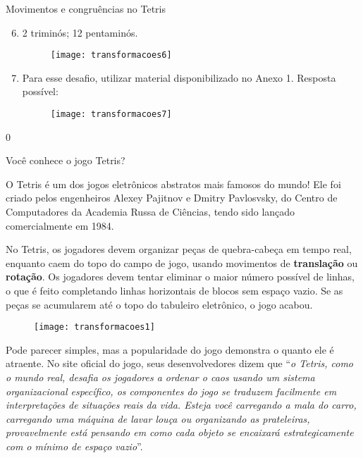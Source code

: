 \begin{answer}{Movimentos e congruências no Tetris}
{
\begin{enumerate}\setcounter{enumi}{5}
\item 2 triminós; 12 pentaminós.
\begin{figure}[H]
\centering

\texttt{[image: transformacoes6]}
\end{figure}

\item Para esse desafio, utilizar material disponibilizado no Anexo 1. Resposta possível:
\begin{figure}[H]
\centering

\texttt{[image: transformacoes7]}
\end{figure}
\end{enumerate}
}{0}
\end{answer}

Você conhece o jogo Tetris? 

O Tetris é um dos jogos eletrônicos abstratos mais famosos do mundo! Ele foi criado pelos engenheiros Alexey Pajitnov e Dmitry Pavlosvsky, do Centro de Computadores da Academia Russa de Ciências, tendo sido lançado comercialmente em 1984. 

No Tetris, os jogadores devem organizar peças de quebra-cabeça em tempo real, enquanto caem do topo do campo de jogo, usando movimentos de \textbf{translação} ou \textbf{rotação}. Os jogadores devem tentar eliminar o maior número possível de linhas, o que é feito completando linhas horizontais de blocos sem espaço vazio. Se as peças se acumularem até o topo do tabuleiro eletrônico, o jogo acabou. 

\begin{figure}[H]
\centering

\texttt{[image: transformacoes1]}
\end{figure}

Pode parecer simples, mas a popularidade do jogo demonstra o quanto ele é atraente. No site oficial do jogo, seus desenvolvedores dizem que “\textit{o Tetris, como o mundo real, desafia os jogadores a ordenar o caos usando um sistema organizacional específico, os componentes do jogo se traduzem facilmente em interpretações de situações reais da vida. Esteja você carregando a mala do carro, carregando uma máquina de lavar louça ou organizando as prateleiras, provavelmente está pensando em como cada objeto se encaixará estrategicamente com o mínimo de espaço vazio}”.

